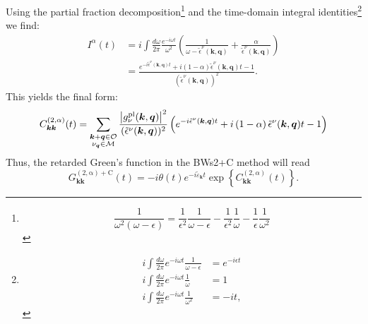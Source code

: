 Using the partial fraction decomposition\footnote{
\begin{equation}
    \frac{1}{\omega^2(\omega - \epsilon)} = \frac{1}{\epsilon^2} \frac{1}{\omega - \epsilon} - \frac{1}{\epsilon^2} \frac{1}{\omega} - \frac{1}{\epsilon} \frac{1}{\omega^2}
\end{equation}}
and the time-domain integral identities\footnote{
\begin{align}
    i \int \frac{d\omega}{2\pi} e^{-i\omega t} \frac{1}{\omega - \epsilon} &= e^{-i\epsilon t} \\
    i \int \frac{d\omega}{2\pi} e^{-i\omega t} \frac{1}{\omega} &= 1 \\
    i \int \frac{d\omega}{2\pi} e^{-i\omega t} \frac{1}{\omega^2} &= -it,
\end{align}}
we find:
\begin{align}
    I^{\alpha}(t) &= i \int \frac{d\omega}{2\pi} \frac{e^{-i\omega t}}{\omega^2} \left( \frac{1}{\omega - \tilde{\epsilon}^\nu(\bm{k},\bm{q})} + \frac{\alpha}{\tilde{\epsilon}^\nu(\bm{k},\bm{q})} \right) \\
&= \frac{e^{-i\tilde{\epsilon}^\nu(\bm{k},\bm{q}) t} + i \left( 1-\alpha \right) \tilde{\epsilon}^\nu(\bm{k},\bm{q}) t - 1}{(\tilde{\epsilon}^\nu(\bm{k},\bm{q}))^2}.
\end{align}
This yields the final form:
\begin{equation}
    C_{\bm{k}\bm{k}}^{(2,\alpha)}(t) = \sum_{\substack{\bm{k}+\bm{q}\in\mathcal{O}\\\nu_{\bm{q}}\in\mathcal{M}}} \frac{\left|g_{\nu}^{\rm pl}(\bm{k},\bm{q})\right|^2}{(\tilde{\epsilon}^\nu(\bm{k},\bm{q}))^2} \left( e^{-i \tilde{\epsilon}^\nu(\bm{k},\bm{q}) t} + i \left( 1-\alpha \right) \tilde{\epsilon}^\nu(\bm{k},\bm{q}) t - 1 \right)
\end{equation}
Thus, the retarded Green's function in the BWs2+C method will read
\begin{equation}
G_{\bm{k}\bm{k}}^{\mathrm{(2,\alpha)+C}}(t) = -i \theta(t) e^{-i\tilde{\varepsilon}_{\bm{k}} t} \exp\left\{C_{\bm{k}\bm{k}}^{(2,\alpha)}(t)\right\}.
\end{equation}

